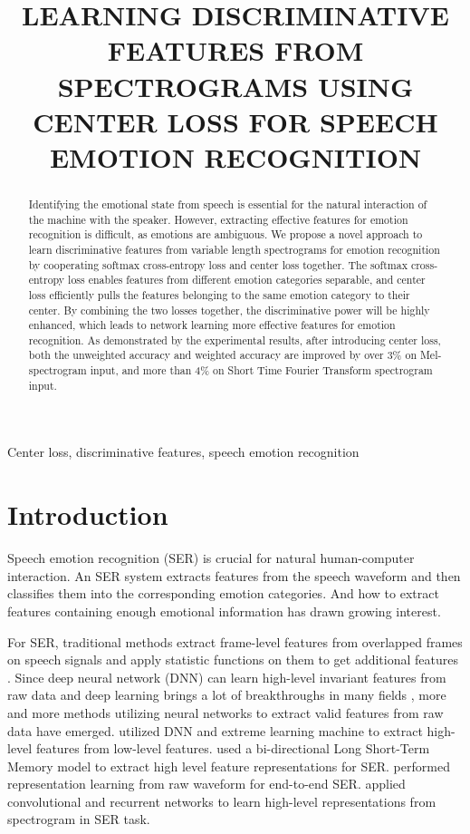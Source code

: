 \documentclass{article}
\title{LEARNING DISCRIMINATIVE FEATURES FROM SPECTROGRAMS USING CENTER LOSS FOR SPEECH EMOTION RECOGNITION}
\begin{document}
%
\maketitle
%
\begin{abstract}
Identifying the emotional state from speech is essential for the natural interaction of the machine with the speaker. However, extracting effective features for emotion recognition is difficult, as emotions are ambiguous. We propose a novel approach to learn discriminative features from variable length spectrograms for emotion recognition by cooperating softmax cross-entropy loss and center loss together. The softmax cross-entropy loss enables features from different emotion categories separable, and center loss efficiently pulls the features belonging to the same emotion category to their center. By combining the two losses together, the discriminative power will be highly enhanced, which leads to network learning more effective features for emotion recognition. As demonstrated by the experimental results, after introducing center loss, both the unweighted accuracy and weighted accuracy are improved by over 3\% on Mel-spectrogram input, and more than 4\% on Short Time Fourier Transform spectrogram input.
\end{abstract}
%
\begin{keywords}
Center loss, discriminative features, speech emotion recognition
\end{keywords}
%
\section{Introduction}

Speech emotion recognition (SER) is crucial for natural human-computer interaction. An SER system extracts features from the speech waveform and then classifies them into the corresponding emotion categories. And how to extract features containing enough emotional information has drawn growing interest.

For SER, traditional methods extract frame-level features from overlapped frames on speech signals and apply statistic functions on them to get additional features \cite{el2011survey}. Since deep neural network (DNN) can learn high-level invariant features from raw data \cite{bengio2013representation} and deep learning brings a lot of breakthroughs in many fields \cite{lecun2015deep}, more and more methods utilizing neural networks to extract valid features from raw data have emerged. \cite{han2014speech} utilized DNN and extreme learning machine to extract high-level features from low-level features. \cite{lee2015high} used a bi-directional Long Short-Term Memory model to extract high level feature representations for SER. \cite{trigeorgis2016adieu} performed representation learning from raw waveform for end-to-end SER. \cite{satt2017efficient} applied convolutional and recurrent networks to learn high-level representations from spectrogram in SER task.
\end{document}
